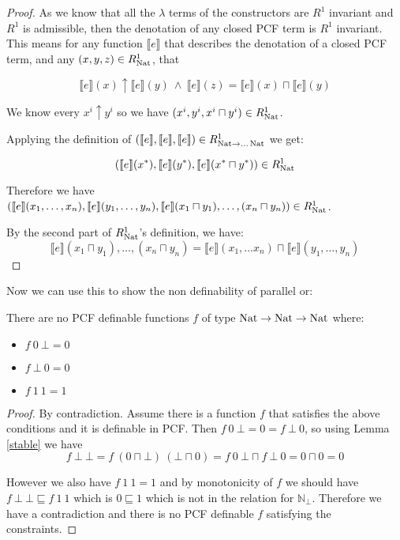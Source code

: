 \begin{proof}
As we know that all the  $\lambda$ terms of the constructors are $R^1$ invariant and $R^1$ is admissible, then the denotation of any closed PCF term is $R^1$ invariant. This means for any function $\llbracket e \rrbracket$ that describes the denotation of a closed PCF term, and any $(x,y,z) \in R_{\operatorname{Nat}}^1$, that

\[ \llbracket e \rrbracket (x) \uparrow \llbracket e \rrbracket(y) \ \wedge \ \llbracket e \rrbracket(z) = \llbracket e \rrbracket(x) \sqcap \llbracket e \rrbracket(y) \]

We know every $x^i \uparrow y^i$ so we have $(x^i, y^i, x^i \sqcap y^i) \in R_{\operatorname{Nat}}^1$.

Applying the definition of $(\llbracket e \rrbracket , \llbracket e \rrbracket, \llbracket e \rrbracket) \in R_{\operatorname{Nat} \to \dots \operatorname{Nat}}^1$ we get:

\[ (\llbracket e \rrbracket(x^*), \llbracket e \rrbracket(y^*), \llbracket e \rrbracket (x^* \sqcap y^*)) \in R_{\operatorname{Nat}}^1 \]

Therefore we have $(\llbracket e \rrbracket(x_1, \dots ,x_n), \llbracket e \rrbracket(y_1, \dots ,y_n),\llbracket e \rrbracket(x_1 \sqcap y_1), \dots ,(x_n \sqcap y_n)) \in R_{\operatorname{Nat}}^1$.


By the second part of $R_{\operatorname{Nat}}^1$'s definition, we have:
\[ \llbracket e \rrbracket(x_1 \sqcap y_1), \dots ,(x_n \sqcap y_n) = \llbracket e \rrbracket(x_1, \dots x_n) \sqcap \llbracket e \rrbracket(y_1, \dots, y_n)\]
\end{proof}

Now we can use this to show the non definability of parallel or:

\vspace{0.5cm}

\begin{cor}{\citep{Streicher06}}
There are no PCF definable functions $f$ of type $\operatorname{Nat} \to \operatorname{Nat} \to \operatorname{Nat}$ where:

\begin{itemize}
\item{$f \ 0 \ \bot = 0$}
\item{$f \ \bot \ 0 = 0$}
\item{$f \ 1 \ 1 = 1$}
\end{itemize}
\end{cor}

\begin{proof}{\citep{Streicher06}}
By contradiction. Assume there is a function $f$ that satisfies the above conditions and it is definable in PCF. Then $f \ 0 \ \bot = 0 = f \ \bot \ 0$, so using Lemma \ref{stable} we have
\[ f \ \bot \ \bot = f \ (0 \sqcap \bot) \ (\bot \sqcap 0) = f \ 0 \ \bot \sqcap f \ \bot \ 0 = 0 \sqcap 0 = 0 \]

However we also have $f \ 1 \ 1 = 1$ and by monotonicity of $f$ we should have $f \ \bot \ \bot \sqsubseteq f \ 1 \ 1$ which is $0 \sqsubseteq 1$ which is not in the relation for $\mathbb{N}_\bot$. Therefore we have a contradiction and there is no PCF definable $f$ satisfying the constraints.
\end{proof}

